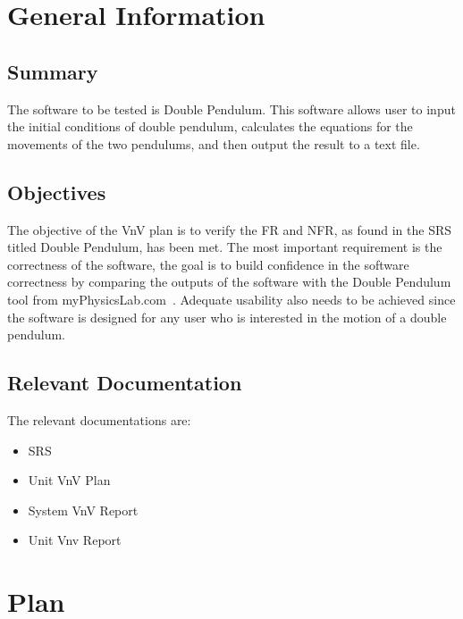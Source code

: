 \documentclass[12pt, titlepage]{article}
\begin{document}
\section{General Information}\label{sec_generalInfo}

\subsection{Summary}

The software to be tested is Double Pendulum. This software allows user to input
the initial conditions of double pendulum, calculates the equations for the
movements of the two pendulums, and then output the result to a text file.

\subsection{Objectives} \label{objective}

The objective of the VnV plan is to verify the FR and NFR, as found in the SRS
titled Double Pendulum, has been met. The most important requirement is the
correctness of the software, the goal is to build confidence in the software
correctness by comparing the outputs of the software with the Double Pendulum
tool from myPhysicsLab.com~\cite{Double_Pendulum}. Adequate usability also needs
to be achieved since the software is designed for any user who is interested in
the motion of a double pendulum.
 
\subsection{Relevant Documentation}

The relevant documentations are:
\begin{itemize}
    \item SRS ~\cite{SRS}
    \item Unit VnV Plan ~\cite{UnitVnV}
    \item System VnV Report~\cite{SystemVnVReport}
    \item Unit Vnv Report~\cite{UnitVnVReport}
\end{itemize}


\section{Plan}\label{sec_Plan}
	
\end{document}
